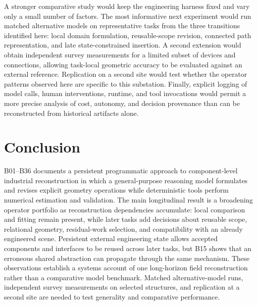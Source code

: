 \documentclass[10pt,a4paper]{article}
\begin{document}
A stronger comparative study would keep the engineering harness fixed
and vary only a small number of factors. The most informative next
experiment would run matched alternative models on representative tasks
from the three transitions identified here: local domain formulation,
reusable-scope revision, connected path representation, and late
state-constrained insertion. A second extension would obtain independent
survey measurements for a limited subset of devices and connections,
allowing task-local geometric accuracy to be evaluated against an
external reference. Replication on a second site would test whether the
operator patterns observed here are specific to this substation.
Finally, explicit logging of model calls, human interventions, runtime,
and tool invocations would permit a more precise analysis of cost,
autonomy, and decision provenance than can be reconstructed from
historical artifacts alone.

\hypertarget{conclusion}{%
\section{Conclusion}\label{conclusion}}

B01--B36 documents a persistent programmatic approach to component-level
industrial reconstruction in which a general-purpose reasoning model
formulates and revises explicit geometry operations while deterministic
tools perform numerical estimation and validation. The main longitudinal
result is a broadening operator portfolio as reconstruction dependencies
accumulate: local comparison and fitting remain present, while later
tasks add decisions about reusable scope, relational geometry,
residual-work selection, and compatibility with an already engineered
scene. Persistent external engineering state allows accepted components
and interfaces to be reused across later tasks, but B15 shows that an
erroneous shared abstraction can propagate through the same mechanism.
These observations establish a systems account of one long-horizon field
reconstruction rather than a comparative model benchmark. Matched
alternative-model runs, independent survey measurements on selected
structures, and replication at a second site are needed to test
generality and comparative performance.
\balance
\small


\end{document}
